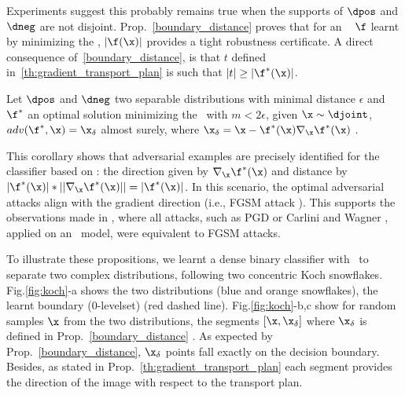  Experiments suggest this probably remains true when the supports of $\dpos$ and $\dneg$  are not disjoint. %
Prop.~\ref{boundary_distance} proves that for an \otnn~ $\f$ learnt by minimizing  the \losshkr, $|\f(\x)|$ provides a tight robustness certificate. A direct consequence of~\ref{boundary_distance}, is  that $t$ defined in~\ref{th:gradient_transport_plan} is such that $|t|\geq|\f^*(\x)|$.

\begin{corollary}\label{fx_grad_adversarial}
Let $\dpos$ and $\dneg$ two separable distributions with minimal distance $\epsilon$ and  $\f^*$ an optimal solution minimizing the \losshkr~with $m<2\epsilon$, given $\x \sim \djoint$,  %
$adv(\f^*,\x) = \x_{\delta}$ %
almost surely, where $\x_\delta = \x -\f^*(\x) \nabla_{\x} \f^*(\x)$ .
\end{corollary}

This corollary shows that adversarial examples are precisely identified for the classifier based on \losshkr: the direction given by $\nabla_{\x} \f^*(\x)$ and distance by $|\f^*(\x)|*||\nabla_{\x} \f^*(\x)||=|\f^*(\x)|$. In this scenario, the optimal adversarial attacks align with the gradient direction (i.e., FGSM attack \cite{Goodfellow2014a}). This supports the observations made in \cite{serrurier2021achieving}, where all attacks, such as PGD \cite{Madry2017} or Carlini and Wagner \cite{carlini2017towards}, applied on an \otnn~model, were equivalent to FGSM attacks.

To illustrate these propositions, we learnt a dense binary classifier with \losshkr~to separate two complex distributions, following two concentric Koch snowflakes. Fig.\ref{fig:koch}-a shows the two distributions (blue and orange snowflakes), the learnt boundary ($0$-levelset) (red dashed line). Fig.\ref{fig:koch}-{b,c} show for random samples $\x$ from the two distributions, the segments $[\x,\x_\delta]$ where $\x_\delta$ is defined in Prop.~\ref{boundary_distance} . %
As expected by Prop.~\ref{boundary_distance},  $\x_\delta$ points fall exactly on the decision boundary. Besides, as stated in Prop.~\ref{th:gradient_transport_plan} each segment provides the direction of the image with respect to the transport plan.

